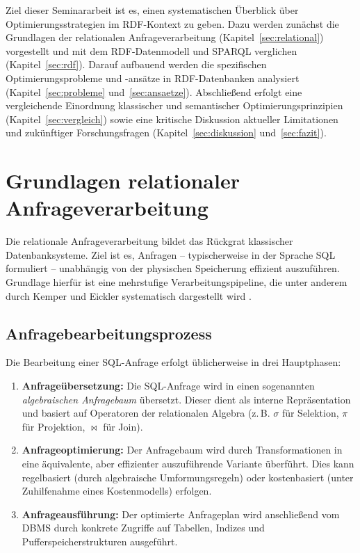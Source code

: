 \documentclass[12pt]{article}
\begin{document}
Ziel dieser Seminararbeit ist es, einen systematischen Überblick über Optimierungsstrategien im RDF-Kontext zu geben. Dazu werden zunächst die Grundlagen der relationalen Anfrageverarbeitung (Kapitel~\ref{sec:relational}) vorgestellt und mit dem RDF-Datenmodell und SPARQL verglichen (Kapitel~\ref{sec:rdf}). Darauf aufbauend werden die spezifischen Optimierungsprobleme und -ansätze in RDF-Datenbanken analysiert (Kapitel~\ref{sec:probleme} und~\ref{sec:ansaetze}). Abschließend erfolgt eine vergleichende Einordnung klassischer und semantischer Optimierungsprinzipien (Kapitel~\ref{sec:vergleich}) sowie eine kritische Diskussion aktueller Limitationen und zukünftiger Forschungsfragen (Kapitel~\ref{sec:diskussion} und~\ref{sec:fazit}).



\section{Grundlagen relationaler Anfrageverarbeitung}

Die relationale Anfrageverarbeitung bildet das Rückgrat klassischer Datenbanksysteme. Ziel ist es, Anfragen – typischerweise in der Sprache SQL formuliert – unabhängig von der physischen Speicherung effizient auszuführen. Grundlage hierfür ist eine mehrstufige Verarbeitungspipeline, die unter anderem durch Kemper und Eickler systematisch dargestellt wird \cite{kemper2022datenbanksysteme}.

\subsection{Anfragebearbeitungsprozess}

Die Bearbeitung einer SQL-Anfrage erfolgt üblicherweise in drei Hauptphasen:

\begin{enumerate}
    \item \textbf{Anfrageübersetzung:} Die SQL-Anfrage wird in einen sogenannten \emph{algebraischen Anfragebaum} übersetzt. Dieser dient als interne Repräsentation und basiert auf Operatoren der relationalen Algebra (z.\,B. $\sigma$ für Selektion, $\pi$ für Projektion, $\bowtie$ für Join).
    
    \item \textbf{Anfrageoptimierung:} Der Anfragebaum wird durch Transformationen in eine äquivalente, aber effizienter auszuführende Variante überführt. Dies kann regelbasiert (durch algebraische Umformungsregeln) oder kostenbasiert (unter Zuhilfenahme eines Kostenmodells) erfolgen.
    
    \item \textbf{Anfrageausführung:} Der optimierte Anfrageplan wird anschließend vom DBMS durch konkrete Zugriffe auf Tabellen, Indizes und Pufferspeicherstrukturen ausgeführt.
\end{enumerate}
\end{document}
